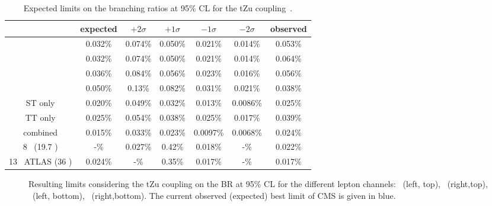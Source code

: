 \begin{table}[ht]
	\centering
	\caption{Expected limits on the branching ratios at 95\% CL for the tZu coupling~\cite{Sirunyan:2017kkr,ATLAS-CONF-2017-070}.}
	\begin{tabular}{|c|c|c|c|c|c|c|}
		\hline 
		& expected & $+2\sigma$ & $+1\sigma$ & $-1\sigma$ & $-2\sigma$ & observed \\ 
		\hline 
		\mumumu\ & 0.032\% & 0.074\% & 0.050\% & 0.021\% & 0.014\% & 0.053\% \\ 
		\hline 
		\emumu\ & 0.032\% & 0.074\% & 0.050\% & 0.021\% & 0.014\% & 0.064\% \\ 
		\hline 
		\eemu\ & 0.036\% & 0.084\% & 0.056\% & 0.023\% & 0.016\% & 0.056\% \\ 
		\hline 
		\eee\ & 0.050\% & 0.13\% & 0.082\% & 0.031\% & 0.021\% & 0.038\% \\ 
		\hline 
		ST only & 0.020\% & 0.049\% & 0.032\% & 0.013\% & 0.0086\% & 0.025\% \\ 
		\hline 
		TT only & 0.025\% & 0.054\% & 0.038\% & 0.025\% & 0.017\% & 0.039\% \\ 
		\hline 
		combined & 0.015\% & 0.033\% & 0.023\% & 0.0097\% & 0.0068\% & 0.024\% \\ 
		\hline
		8 \TeV\  (19.7 \fbinv)    & -\% &0.027\% & 0.42\% & 0.018\% & -\% & 0.022\% \\
		\hline
		13 \TeV\ ATLAS (36 \fbinv)    & 0.024\% & -\% & 0.35\% & 0.017\%& -\% & 0.017\%\\
		
		\hline
	\end{tabular} 
	\label{tab:ResultsTZU}
\end{table}
\begin{figure}[ht]
	\centering
	\caption{Resulting limits considering the tZu coupling on the BR at 95\%  CL for the different lepton channels: \mumumu\ (left, top), \emumu\ (right,top), \eee\ (left, bottom), \eemu\ (right,bottom). The current observed (expected) best limit of CMS is given in blue.}
	\label{fig:exclusionlimitbrfcnczutchannels}
\end{figure}

